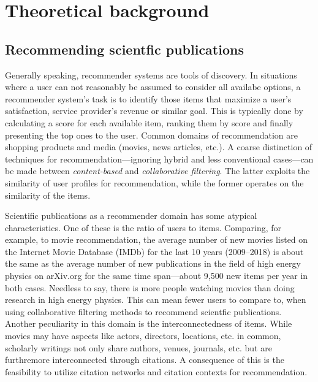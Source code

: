 \section{Theoretical background}
\subsection{Recommending scientfic publications}
Generally speaking, recommender systems are tools of discovery. In situations where a user can not reasonably be assumed to consider all availabe options, a recommender system's task is to identify those items that maximize a user's satisfaction, service provider's revenue or similar goal. This is typically done by calculating a score for each available item, ranking them by score and finally presenting the top ones to the user. Common domains of recommendation are shopping products and media (movies, news articles, etc.). A coarse distinction of techniques for recommendation---ignoring hybrid and less conventional cases---can be made between \emph{content-based} and \emph{collaborative filtering}. The latter exploits the similarity of user profiles for recommendation, while the former operates on the similarity of the items.~\cite{Ricci2015}

Scientific publications as a recommender domain has some atypical characteristics. One of these is the ratio of users to items. Comparing, for example, to movie recommendation, the average number of new movies listed on the Internet Movie Database (IMDb) for the last 10 years (2009--2018) is about the same as the average number of new publications in the field of high energy physics on arXiv.org for the same time span---about 9,500 new items per year in both cases. Needless to say, there is more people watching movies than doing research in high energy physics. This can mean fewer users to compare to, when using collaborative filtering methods to recommend scientfic publications. Another peculiarity in this domain is the interconnectedness of items. While movies may have aspects like actors, directors, locations, etc. in common, scholarly writings not only share authors, venues, journals, etc. but are furthremore interconnected through citations. A consequence of this is the feasibility to utilize citation networks and citation contexts for recommendation.

